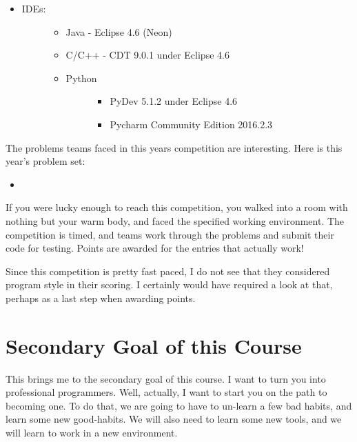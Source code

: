\documentclass[letterpaper,11pt,english]{sphinxmanual}
\begin{document}
\begin{itemize}
\begin{description}
\begin{itemize}
\item {} \begin{description}
\item[{IDEs:}] \leavevmode\begin{itemize}
\item {} 
Java - Eclipse 4.6 (Neon)

\item {} 
C/C++ - CDT 9.0.1 under Eclipse 4.6

\item {} \begin{description}
\item[{Python}] \leavevmode\begin{itemize}
\item {} 
PyDev 5.1.2 under Eclipse 4.6

\item {} 
Pycharm Community Edition 2016.2.3

\end{itemize}

\end{description}

\end{itemize}

\end{description}

\end{itemize}

\end{description}

\end{itemize}

The problems teams faced in this years competition are interesting. Here is
this year’s problem set:
\begin{itemize}
\item {} 

\end{itemize}

If you were lucky enough to reach this competition, you walked into a room with
nothing but your warm body, and faced the specified working environment. The
competition is timed, and teams work through the problems and submit their code
for testing. Points are awarded for the entries that actually work!

Since this competition is pretty fast paced, I do not see that they considered
program style in their scoring. I certainly would have required a look at that,
perhaps as a last step when awarding points.


\section{Secondary Goal of this Course}
\label{\detokenize{01_introduction/are-you-ready-to-code:secondary-goal-of-this-course}}
This brings me to the secondary goal of this course. I want to turn you into
professional programmers. Well, actually, I want to start you on the path to
becoming one. To do that, we are going to have to un-learn a few bad habits,
and learn some new good-habits. We will also need to learn some new tools, and
we will learn to work in a new environment.
\end{document}
